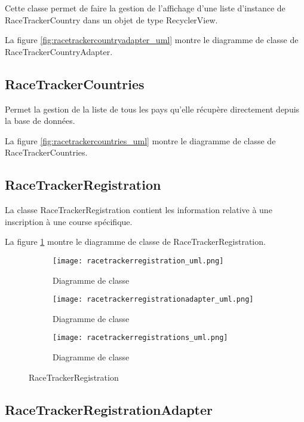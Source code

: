 Cette classe permet de faire la gestion de l'affichage d'une liste d'instance de RaceTrackerCountry dans un objet de type RecyclerView.

La figure \ref{fig:racetrackercountryadapter_uml} montre le diagramme de classe de RaceTrackerCountryAdapter.

\subsection{RaceTrackerCountries}

Permet la gestion de la liste de tous les pays qu'elle récupère directement depuis la base de données.

La figure \ref{fig:racetrackercountries_uml} montre le diagramme de classe de RaceTrackerCountries.

\subsection{RaceTrackerRegistration}

La classe RaceTrackerRegistration contient les information relative à une inscription à une course spécifique.

La figure \ref{fig:racetrackerregistration_uml} montre le diagramme de classe de RaceTrackerRegistration.

\begin{figure}[htb!]
    \centering
    \begin{subfigure}[htb]{1\textwidth}
		\texttt{[image: racetrackerregistration\_uml.png]} 
		\caption{Diagramme de classe}
		\label{fig:racetrackerregistration_uml}
    \end{subfigure}
    \begin{subfigure}[htb]{1\textwidth}
		\texttt{[image: racetrackerregistrationadapter\_uml.png]} 
		\caption{Diagramme de classe}
		\label{fig:racetrackerregistrationadapter_uml}
    \end{subfigure}
    \begin{subfigure}[htb]{1\textwidth}
		\texttt{[image: racetrackerregistrations\_uml.png]} 
		\caption{Diagramme de classe}
		\label{fig:racetrackerregistrations_uml}
    \end{subfigure}
    \caption{RaceTrackerRegistration}\label{fig:racetrackerregistration_fig}
\end{figure}

\subsection{RaceTrackerRegistrationAdapter}

